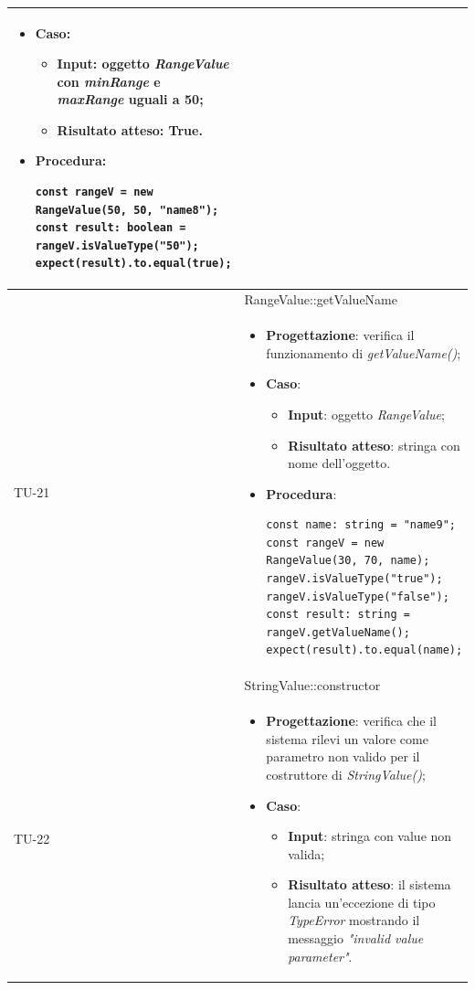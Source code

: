 \begin{longtable}{|C{1.5cm}|C{14.5cm}|}
\begin{itemize}
		\item \textbf{Caso}: 
		\begin{itemize}
			\item \textbf{Input}: oggetto \emph{RangeValue} con  \emph{minRange} e \emph{maxRange} uguali a 50;
			\item \textbf{Risultato atteso}: True.
		\end{itemize}
		\item \textbf{Procedura}:
		\begin{lstlisting}
const rangeV = new RangeValue(50, 50, "name8");
const result: boolean = rangeV.isValueType("50");
expect(result).to.equal(true);		
		\end{lstlisting}
	\end{itemize}\\
	\hline
	 & RangeValue::getValueName\\
	\hline
	{TU-21} &  
	\begin{itemize}
		\item \textbf{Progettazione}: verifica il funzionamento di \emph{getValueName()};
		\item \textbf{Caso}: 
		\begin{itemize}
			\item \textbf{Input}: oggetto \emph{RangeValue};
			\item \textbf{Risultato atteso}: stringa con nome dell'oggetto.
		\end{itemize}
		\item \textbf{Procedura}:
		\begin{lstlisting}
const name: string = "name9";
const rangeV = new RangeValue(30, 70, name);
rangeV.isValueType("true");
rangeV.isValueType("false");
const result: string = rangeV.getValueName();
expect(result).to.equal(name);		
		\end{lstlisting}
	\end{itemize}\\
	\hline
	 & StringValue::constructor\\
	\hline
	{TU-22} &  
	\begin{itemize}
		\item \textbf{Progettazione}: verifica che il sistema rilevi un valore come parametro non valido per il costruttore di \emph{StringValue()};
		\item \textbf{Caso}: 
		\begin{itemize}
			\item \textbf{Input}: stringa con value non valida;
			\item \textbf{Risultato atteso}: il sistema lancia un'eccezione di tipo \emph{TypeError} mostrando il messaggio \emph{"invalid value parameter"}.

\end{itemize}
\end{itemize}
\end{longtable}
